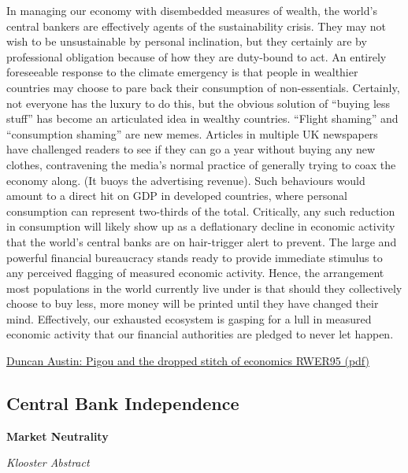 \documentclass[
]{book}
\begin{document}
In managing our economy with disembedded measures of wealth,
the world's central bankers are effectively agents of the sustainability crisis. They may not
wish to be unsustainable by personal inclination, but they certainly are by professional
obligation because of how they are duty-bound to act.
An entirely foreseeable response to the climate emergency is that people in wealthier
countries may choose to pare back their consumption of non-essentials. Certainly, not
everyone has the luxury to do this, but the obvious solution of ``buying less stuff'' has become
an articulated idea in wealthy countries. ``Flight shaming'' and ``consumption shaming'' are new
memes. Articles in multiple UK newspapers have challenged readers to see if they can go a
year without buying any new clothes, contravening the media's normal practice of generally
trying to coax the economy along. (It buoys the advertising revenue).
Such behaviours would amount to a direct hit on GDP in developed countries, where personal
consumption can represent two-thirds of the total. Critically, any such reduction in
consumption will likely show up as a deflationary decline in economic activity that the world's
central banks are on hair-trigger alert to prevent. The large and powerful financial
bureaucracy stands ready to provide immediate stimulus to any perceived flagging of
measured economic activity.
Hence, the arrangement most populations in the world currently live under is that should they
collectively choose to buy less, more money will be printed until they have changed their
mind. Effectively, our exhausted ecosystem is gasping for a lull in measured economic activity
that our financial authorities are pledged to never let happen.

\href{pdf/Austin_2021_Pigou_\%20and_the_dropped_stitch_of_economics_RWER95.pdf}{Duncan Austin: Pigou and the dropped stitch of economics RWER95 (pdf)}

\hypertarget{central-bank-independence}{%
\subsection{Central Bank Independence}\label{central-bank-independence}}

\textbf{Market Neutrality}

\emph{Klooster Abstract}
\end{document}

